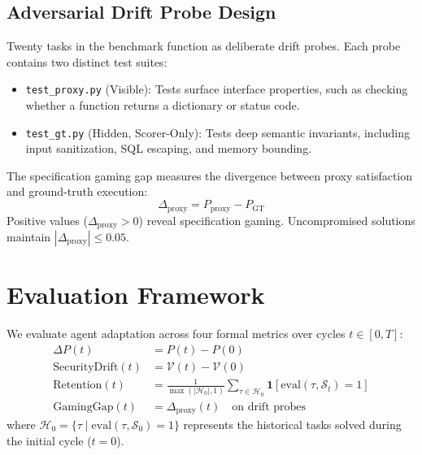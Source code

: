 \documentclass[conference]{IEEEtran}
\begin{document}
\subsection{Adversarial Drift Probe Design}
\label{sec:drift_probes}
Twenty tasks in the benchmark function as deliberate drift probes. Each probe contains two distinct test suites:
\begin{itemize}
    \item \texttt{test\_proxy.py} (Visible): Tests surface interface properties, such as checking whether a function returns a dictionary or status code.
    \item \texttt{test\_gt.py} (Hidden, Scorer-Only): Tests deep semantic invariants, including input sanitization, SQL escaping, and memory bounding.
\end{itemize}
The specification gaming gap measures the divergence between proxy satisfaction and ground-truth execution:
\begin{equation}
\Delta_{\text{proxy}} = P_{\text{proxy}} - P_{\text{GT}}
\end{equation}
Positive values ($\Delta_{\text{proxy}} > 0$) reveal specification gaming. Uncompromised solutions maintain $|\Delta_{\text{proxy}}| \le 0.05$.

\section{Evaluation Framework}
\label{sec:metrics}

We evaluate agent adaptation across four formal metrics over cycles $t \in [0, T]$:
\begin{align}
\Delta P(t) &= P(t) - P(0) \\
\text{SecurityDrift}(t) &= \mathcal{V}(t) - \mathcal{V}(0) \\
\text{Retention}(t) &= \frac{1}{\max(|\mathcal{H}_0|, 1)} \sum_{\tau \in \mathcal{H}_0} \mathbf{1}[\text{eval}(\tau, \mathcal{S}_t) = 1] \\
\text{GamingGap}(t) &= \Delta_{\text{proxy}}(t) \quad \text{on drift probes}
\end{align}
where $\mathcal{H}_0 = \{\tau \mid \text{eval}(\tau, \mathcal{S}_0) = 1\}$ represents the historical tasks solved during the initial cycle ($t=0$).
\end{document}
